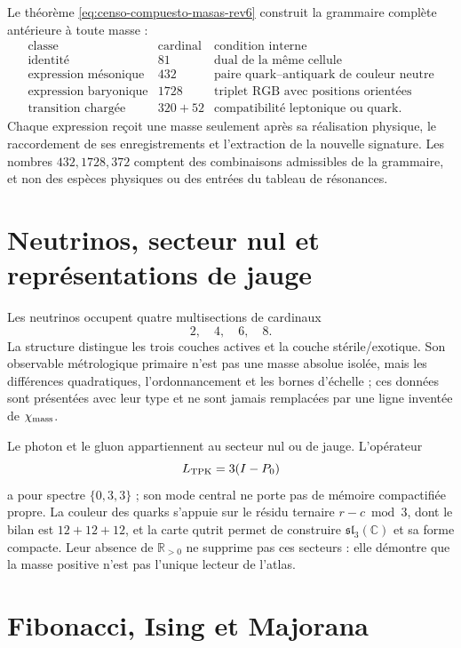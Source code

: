 Le théorème \eqref{eq:censo-compuesto-masas-rev6} construit la grammaire
complète antérieure à toute masse :
\[
\begin{array}{c|r|l}
\text{classe}&\text{cardinal}&\text{condition interne}\\ \hline
\text{identité}&81&\text{dual de la même cellule}\\
\text{expression mésonique}&432&\text{paire quark--antiquark de couleur neutre}\\
\text{expression baryonique}&1728&\text{triplet RGB avec positions orientées}\\
\text{transition chargée}&320+52&
\text{compatibilité leptonique ou quark}.
\end{array}
\tag{C7}\label{eq:clases-compuestas-catalogo-rev6}
\]
Chaque expression reçoit une masse seulement après sa réalisation physique,
le raccordement de ses enregistrements et l'extraction de la nouvelle signature. Les nombres
\(432,1728,372\) comptent des combinaisons admissibles de la grammaire, et non
des espèces physiques ou des entrées du tableau de résonances.

\section{Neutrinos, secteur nul et représentations de jauge}

Les neutrinos occupent quatre multisections de cardinaux
\[
2,\quad4,\quad6,\quad8.
\]
La structure distingue les trois couches actives et la couche
stérile/exotique. Son observable métrologique primaire n'est pas une masse absolue
isolée, mais les différences quadratiques, l'ordonnancement et les bornes
d'échelle ; ces données sont présentées avec leur type et ne sont jamais remplacées par une
ligne inventée de \(\chi_{\rm mass}\).

Le photon et le gluon appartiennent au secteur nul ou de jauge. L'opérateur
\[
L_{\rm TPK}=3(I-P_0)
\]
a pour spectre \(\{0,3,3\}\) ; son mode central ne porte pas de mémoire
compactifiée propre. La couleur des quarks s'appuie sur le résidu ternaire
\(r-c\bmod3\), dont le bilan est \(12+12+12\), et la carte qutrit permet de
construire \(\mathfrak{sl}_3(\mathbb C)\) et sa forme compacte. Leur absence
de \(\mathbb R_{>0}\) ne supprime pas ces secteurs : elle démontre que la masse
positive n'est pas l'unique lecteur de l'atlas.

\section{Fibonacci, Ising et Majorana}

